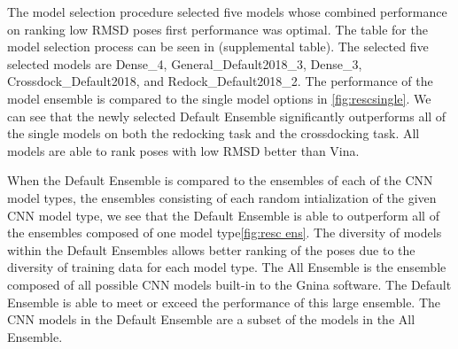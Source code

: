 \documentclass[journal=jcisd8,manuscript=article]{achemso}
\begin{document}
The model selection procedure selected five models whose combined performance on ranking low RMSD poses first performance was optimal. The table for the model selection process can be seen in (supplemental table). The selected five selected models are Dense\_4, General\_Default2018\_3, Dense\_3, Crossdock\_Default2018, and Redock\_Default2018\_2. The performance of the model ensemble is compared to the single model options in \ref{fig:rescsingle}. We can see that the newly selected Default Ensemble significantly outperforms all of the single models on both the redocking task and the crossdocking task. All models are able to rank poses with low RMSD better than Vina. 


When the Default Ensemble is compared to the ensembles of each of the CNN model types, the ensembles consisting of each random intialization of the given CNN model type, we see that the Default Ensemble is able to outperform all of the ensembles composed of one model type\ref{fig:resc ens}. The diversity of models within the Default Ensembles allows better ranking of the poses due to the diversity of training data for each model type. The All Ensemble is the ensemble composed of all possible CNN models built-in to the Gnina software. The Default Ensemble is able to meet or exceed the performance of this large ensemble. The CNN models in the Default Ensemble are a subset of the models in the All Ensemble.
\end{document}
